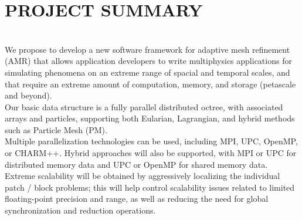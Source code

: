 \documentclass[14pt,letter]{article}
\begin{document}
\tableofcontents

\nocite{StSh09} %
\nocite{WiHy03} %
\nocite{GuWi06} %
\nocite{BuGh08} %
\nocite{BaBu09} %

\nocite{LaTa06} %



\section{PROJECT SUMMARY}  \label{s:summary}

\ \\ 
We propose to develop a new software framework for adaptive mesh
refinement (AMR) that allows application developers to write
multiphysics applications for simulating phenomena on an extreme range
of spacial and temporal scales, and that require an extreme amount of
computation, memory, and storage (petascale and beyond).
%
%
\ \\ 
Our basic data structure is a fully parallel distributed octree, with
associated arrays and particles, supporting both Eularian, Lagrangian,
and hybrid methods such as Particle Mesh (PM).
%
\ \\ 
Multiple parallelization technologies can be used, including MPI, UPC,
OpenMP, or CHARM++.  Hybrid approaches will also be supported, with
MPI or UPC for distributed memory data and UPC or OpenMP for shared
memory data.
%
\ \\ 
Extreme scalability will be obtained by aggressively localizing the
individual patch / block problems; this will help control scalability issues
related to limited floating-point precision and range, as well as
reducing the need for global synchronization and reduction operations.
\end{document}
